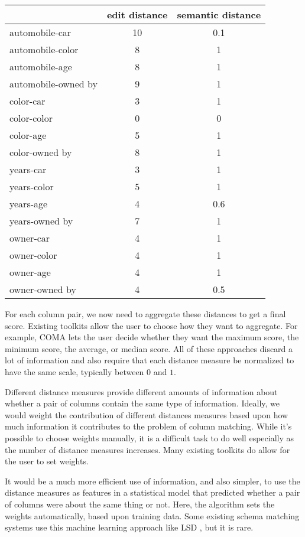 \documentclass{datamade}
\theoremstyle{definition}
\theoremstyle{remark}
\begin{document}
\begin{center}
\begin{tabular}{|l|c|c|}
  \hline
  & edit distance & semantic distance \\\hline
  automobile-car & 10 & 0.1 \\\hline
  automobile-color & 8 & 1 \\\hline
  automobile-age & 8 & 1 \\\hline
  automobile-owned by & 9 & 1 \\\hline
  color-car & 3 & 1 \\\hline
  color-color & 0 & 0 \\\hline
  color-age & 5 & 1 \\\hline
  color-owned by & 8 & 1 \\\hline
  years-car & 3 & 1 \\\hline
  years-color & 5 & 1 \\\hline
  years-age & 4 & 0.6 \\\hline
  years-owned by & 7 & 1 \\\hline
  owner-car & 4 & 1 \\\hline
  owner-color & 4 & 1 \\\hline
  owner-age & 4 & 1 \\\hline
  owner-owned by & 4 & 0.5 \\\hline
\end{tabular}
\end{center}

For each column pair, we now need to aggregate these distances to get a
final score. Existing toolkits allow the user to choose how they want to
aggregate. For example, COMA lets the user decide whether they want
the maximum score, the minimum score, the average, or median score.
All of these approaches discard a lot of information and also require
that each distance measure be normalized to have the same
scale, typically between $0$ and $1$.

Different distance measures provide different amounts of information
about whether a pair of columns contain the same type of
information. Ideally, we would weight the contribution of different
distances measures based upon how much information it contributes to
the problem of column matching. While it's possible to choose weights
manually, it is a difficult task to do well especially as the number
of distance measures increases. Many existing toolkits do allow for
the user to set weights.

It would be a much more efficient use of information, and also
simpler, to use the distance measures as features in a statistical
model that predicted whether a pair of columns were about the same
thing or not. Here, the algorithm sets the weights automatically,
based upon training data. Some existing schema matching systems use
this machine learning approach like LSD \cite{machine}, but it is rare.
\end{document}
